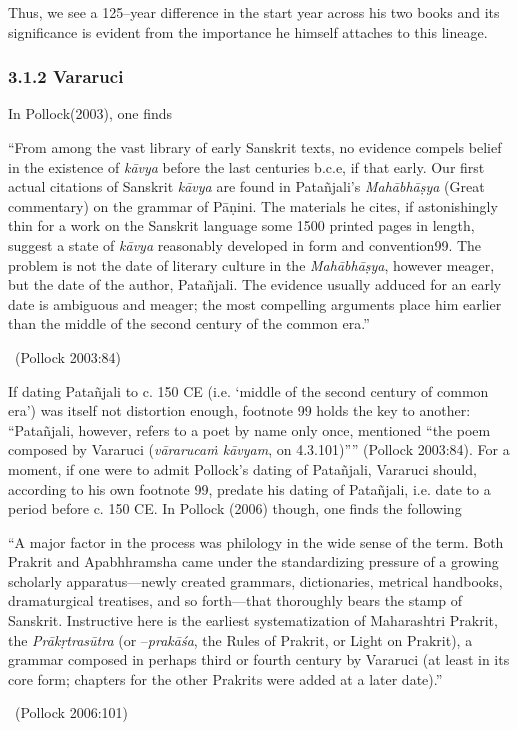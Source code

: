 Thus, we see a 125–year difference in the start year across his two books and its significance is evident from the importance he himself attaches to this lineage.


\subsubsection*{3.1.2 Vararuci}

In Pollock(2003), one finds

\begin{myquote}
“From among the vast library of early Sanskrit texts, no evidence compels belief in the existence of \textit{kāvya} before the last centuries b.c.e, if that early. Our first actual citations of Sanskrit \textit{kāvya} are found in Patañjali’s \textit{Mahābhāṣya} (Great commentary) on the grammar of Pāṇini. The materials he cites, if astonishingly thin for a work on the Sanskrit language some 1500 printed pages in length, suggest a state of \textit{kāvya} reasonably developed in form and convention99. The problem is not the date of literary culture in the \textit{Mahābhāṣya}, however meager, but the date of the author, Patañjali. The evidence usually adduced for an early date is ambiguous and meager; the most compelling arguments place him earlier than the middle of the second century of the common era.” 

~\hfill (Pollock 2003:84)
\end{myquote}

If dating Patañjali to c. 150 CE (i.e. ‘middle of the second century of common era’) was itself not distortion enough, footnote 99 holds the key to another: “Patañjali, however, refers to a poet by name only once, mentioned “the poem composed by Vararuci (\textit{vārarucaṁ kāvyam}, on 4.3.101)”” (Pollock 2003:84). For a moment, if one were to admit Pollock’s dating of Patañjali, Vararuci should, according to his own footnote 99, predate his dating of Patañjali, i.e. date to a period before c. 150 CE. In Pollock (2006) though, one finds the following

\begin{myquote}
“A major factor in the process was philology in the wide sense of the term. Both Prakrit and Apabhhramsha came under the standardizing pressure of a growing scholarly apparatus—newly created grammars, dictionaries, metrical handbooks, dramaturgical treatises, and so forth—that thoroughly bears the stamp of Sanskrit. Instructive here is the earliest systematization of Maharashtri Prakrit, the \textit{Prākṛtrasūtra} (or –\textit{prakāśa}, the Rules of Prakrit, or Light on Prakrit), a grammar composed in perhaps third or fourth century by Vararuci (at least in its core form; chapters for the other Prakrits were added at a later date).” 

~\hfill (Pollock 2006:101)
\end{myquote}

